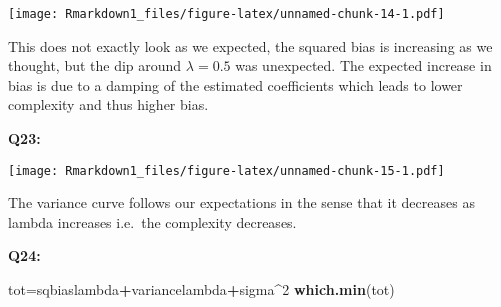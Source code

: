 \documentclass[]{article}
\newenvironment{Shaded}{\begin{snugshade}}{\end{snugshade}}
\newcommand{\KeywordTok}[1]{\textcolor[rgb]{0.13,0.29,0.53}{\textbf{#1}}}
\newcommand{\DataTypeTok}[1]{\textcolor[rgb]{0.13,0.29,0.53}{#1}}
\newcommand{\DecValTok}[1]{\textcolor[rgb]{0.00,0.00,0.81}{#1}}
\newcommand{\StringTok}[1]{\textcolor[rgb]{0.31,0.60,0.02}{#1}}
\newcommand{\OtherTok}[1]{\textcolor[rgb]{0.56,0.35,0.01}{#1}}
\newcommand{\ControlFlowTok}[1]{\textcolor[rgb]{0.13,0.29,0.53}{\textbf{#1}}}
\newcommand{\OperatorTok}[1]{\textcolor[rgb]{0.81,0.36,0.00}{\textbf{#1}}}
\newcommand{\NormalTok}[1]{#1}
\begin{document}
\texttt{[image: Rmarkdown1\_files/figure-latex/unnamed-chunk-14-1.pdf]}

This does not exactly look as we expected, the squared bias is
increasing as we thought, but the dip around \(\lambda = 0.5\) was
unexpected. The expected increase in bias is due to a damping of the
estimated coefficients which leads to lower complexity and thus higher
bias.

\textbf{Q23:}

\begin{Shaded}
\end{Shaded}

\texttt{[image: Rmarkdown1\_files/figure-latex/unnamed-chunk-15-1.pdf]}

The variance curve follows our expectations in the sense that it
decreases as lambda increases i.e.~the complexity decreases.

\textbf{Q24:}

\begin{Shaded}
\begin{Highlighting}[]
\NormalTok{tot=sqbiaslambda}\OperatorTok{+}\NormalTok{variancelambda}\OperatorTok{+}\NormalTok{sigma}\OperatorTok{^}\DecValTok{2}
\KeywordTok{which.min}\NormalTok{(tot)}
\end{Highlighting}
\end{Shaded}
\end{document}
